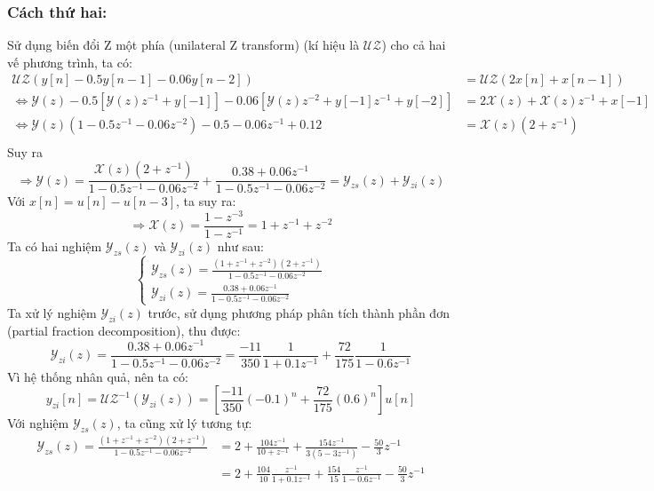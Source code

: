 \documentclass{article}
\begin{document}
\subsubsection*{Cách thứ hai:}
Sử dụng biến đổi Z một phía (unilateral Z transform) (kí hiệu là $\mathscr{UZ}$) cho cả hai vế phương trình, ta có:
\begin{equation*}
    \begin{split}
    \mathscr{UZ}(y[n]-0.5y[n-1]-0.06y[n-2])&=\mathscr{UZ}(2x[n]+x[n-1]) \\
    \Leftrightarrow \mathscr{Y}(z)-0.5[\mathscr{Y}(z)z^{-1}+y[-1]]-0.06[\mathscr{Y}(z)z^{-2}+y[-1]z^{-1}+y[-2]]&=2\mathscr{X}(z)+\mathscr{X}(z)z^{-1}+x[-1] \\
    \Leftrightarrow \mathscr{Y}(z)(1-0.5z^{-1}-0.06z^{-2})-0.5-0.06z^{-1}+0.12&=\mathscr{X}(z)(2+z^{-1})\\
\end{split}
\end{equation*}
Suy ra
    $$\Rightarrow \mathscr{Y}(z) = \frac{\mathscr{X}(z)(2+z^{-1})}{1-0.5z^{-1}-0.06z^{-2}}+\frac{0.38+0.06z^{-1}}{1-0.5z^{-1}-0.06z^{-2}}=\mathscr{Y}_{zs}(z)+\mathscr{Y}_{zi}(z)$$
Với $x[n]=u[n]-u[n-3]$, ta suy ra:
$$\Rightarrow \mathscr{X}(z)=\frac{1-z^{-3}}{1-z^{-1}}=1+z^{-1}+z^{-2}$$
Ta có hai nghiệm $\mathscr{Y}_{zs}(z)$ và $\mathscr{Y}_{zi}(z)$ như sau:
\begin{equation*}
    \begin{cases*}
        \mathscr{Y}_{zs}(z) = \frac{(1+z^{-1}+z^{-2})(2+z^{-1})}{1-0.5z^{-1}-0.06z^{-2}} \\
        \mathscr{Y}_{zi}(z) = \frac{0.38+0.06z^{-1}}{1-0.5z^{-1}-0.06z^{-2}}
    \end{cases*}
\end{equation*}
Ta xử lý nghiệm $\mathscr{Y}_{zi}(z)$ trước, sử dụng phương pháp phân tích thành phần đơn (partial fraction decomposition), thu được:
\begin{equation*}
    \mathscr{Y}_{zi}(z)=\frac{0.38+0.06z^{-1}}{1-0.5z^{-1}-0.06z^{-2}}=\frac{-11}{350}\frac{1}{1+0.1z^{-1}}+\frac{72}{175}\frac{1}{1-0.6z^{-1}}
\end{equation*}
Vì hệ thống nhân quả, nên ta có:
\begin{equation*}
y_{zi}[n]=\mathscr{UZ}^{-1}(\mathscr{Y}_{zi}(z))=\left[\frac{-11}{350}(-0.1)^{n}+\frac{72}{175}(0.6)^{n}\right]u[n]
\end{equation*}
Với nghiệm $\mathscr{Y}_{zs}(z)$, ta cũng xử lý tương tự:
\begin{equation*}
    \begin{split}
\mathscr{Y}_{zs}(z)=\frac{(1+z^{-1}+z^{-2})(2+z^{-1})}{1-0.5z^{-1}-0.06z^{-2}}&=2+\frac{104z^{-1}}{10+z^{-1}}+\frac{154z^{-1}}{3(5-3z^{-1})}-\frac{50}{3}z^{-1} \\
&= 2+\frac{104}{10}\frac{z^{-1}}{1+0.1z^{-1}}+\frac{154}{15}\frac{z^{-1}}{1-0.6z^{-1}}-\frac{50}{3}z^{-1}
    \end{split}
\end{equation*}
\end{document}
